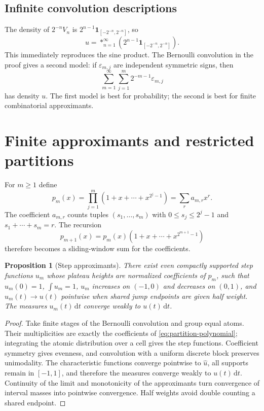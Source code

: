 \documentclass[11pt]{article}
\newtheorem{proposition}[theorem]{Proposition}
\theoremstyle{definition}
\theoremstyle{remark}
\newcommand{\dd}{\,\mathrm d}\newcommand{\e}{\mathrm e}\newcommand{\ii}{\mathrm i}
\newcommand{\ind}{\mathbf 1}\newcommand{\floor}[1]{\left\lfloor#1\right\rfloor}
\begin{document}
\subsection{Infinite convolution descriptions}
The density of $2^{-n}V_n$ is $2^{n-1}\ind_{[-2^{-n},2^{-n}]}$, so
\begin{equation}\label{eq:uniform-convolution}
 u=\mathop{*}_{n=1}^{\infty}
 \left(2^{n-1}\ind_{[-2^{-n},2^{-n}]}\right).
\end{equation}
This immediately reproduces the sine product.  The Bernoulli convolution in the proof gives a second model: if $\varepsilon_{m,j}$ are independent symmetric signs, then
\[
 \sum_{m=1}^{\infty}\sum_{j=1}^{m}2^{-m-1}\varepsilon_{m,j}
\]
has density $u$.  The first model is best for probability; the second is best for finite combinatorial approximants.

\section{Finite approximants and restricted partitions}\label{sec:approximants}
For $m\ge1$ define
\begin{equation}\label{eq:partition-polynomial}
 p_m(x)=\prod_{j=1}^{m}(1+x+\cdots+x^{2^j-1})
 =\sum_r a_{m,r}x^r.
\end{equation}
The coefficient $a_{m,r}$ counts tuples $(s_1,\ldots,s_m)$ with
$0\le s_j\le2^j-1$ and $s_1+\cdots+s_m=r$.  The recursion
\[
 p_{m+1}(x)=p_m(x)(1+x+\cdots+x^{2^{m+1}-1})
\]
therefore becomes a sliding-window sum for the coefficients.

\begin{proposition}[Step approximants]\label{prop:step-approximants}
There exist even compactly supported step functions $u_m$ whose plateau heights are normalized coefficients of $p_m$, such that $u_m(0)=1$, $\int u_m=1$, $u_m$ increases on $(-1,0)$ and decreases on $(0,1)$, and $u_m(t)\to u(t)$ pointwise when shared jump endpoints are given half weight.  The measures $u_m(t)\dd t$ converge weakly to $u(t)\dd t$.
\end{proposition}
\begin{proof}
Take finite stages of the Bernoulli convolution and group equal atoms.  Their multiplicities are exactly the coefficients of \eqref{eq:partition-polynomial}; integrating the atomic distribution over a cell gives the step functions.  Coefficient symmetry gives evenness, and convolution with a uniform discrete block preserves unimodality.  The characteristic functions converge pointwise to $\widehat u$, all supports remain in $[-1,1]$, and therefore the measures converge weakly to $u(t)\dd t$.  Continuity of the limit and monotonicity of the approximants turn convergence of interval masses into pointwise convergence.  Half weights avoid double counting a shared endpoint.
\end{proof}
\end{document}
